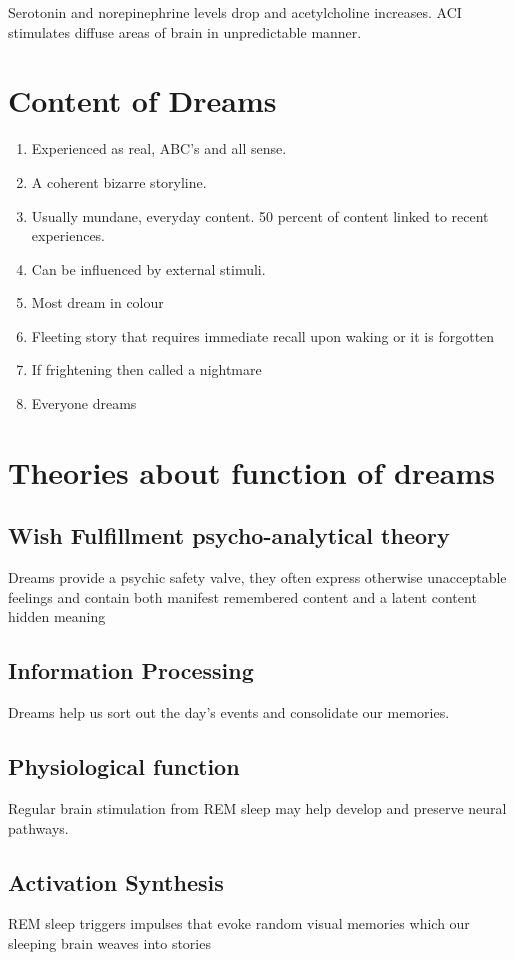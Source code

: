 \documentclass[12pt]{article}
\begin{document}
Serotonin and norepinephrine levels drop and acetylcholine increases. ACI stimulates diffuse areas of brain in unpredictable manner.

\section*{Content of Dreams}
\begin{enumerate}
\item Experienced as real, ABC's and all sense.
\item A coherent bizarre storyline.
\item Usually mundane, everyday content. 50 percent of content linked to recent experiences.
\item Can be influenced by external stimuli.
\item Most dream in colour
\item Fleeting story that requires immediate recall upon waking or it is forgotten
\item If frightening then called a nightmare
\item Everyone dreams
\end{enumerate}
\section*{Theories about function of dreams}
\subsection*{Wish Fulfillment psycho-analytical theory}
Dreams provide a psychic safety valve, they often express otherwise unacceptable feelings and contain both manifest remembered content and a latent content hidden meaning
\subsection*{Information Processing}
Dreams help us sort out the day's events and consolidate our memories.
\subsection*{Physiological function}
Regular brain stimulation from REM sleep may help develop and preserve neural pathways.
\subsection*{Activation Synthesis}
REM sleep triggers impulses that evoke random visual memories which our sleeping brain weaves into stories
\end{document}
